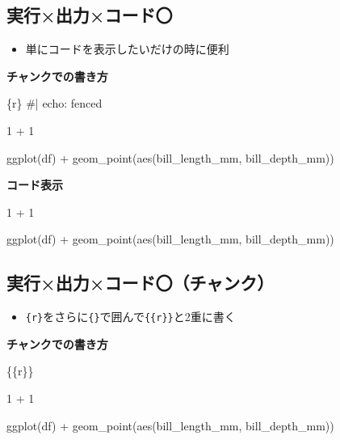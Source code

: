 \documentclass[
  b5paper,
  xelatex, ja=standard]{bxjsbook}
\newenvironment{Shaded}{\begin{snugshade}}{\end{snugshade}}
\newcommand{\DecValTok}[1]{\textcolor[rgb]{0.68,0.00,0.00}{#1}}
\newcommand{\FunctionTok}[1]{\textcolor[rgb]{0.28,0.35,0.67}{#1}}
\newcommand{\InformationTok}[1]{\textcolor[rgb]{0.37,0.37,0.37}{#1}}
\newcommand{\NormalTok}[1]{\textcolor[rgb]{0.00,0.23,0.31}{#1}}
\newcommand{\SpecialCharTok}[1]{\textcolor[rgb]{0.37,0.37,0.37}{#1}}
\providecommand{\tightlist}{%
  \setlength{\itemsep}{0pt}\setlength{\parskip}{0pt}}\usepackage{longtable,booktabs,array}
\begin{document}
\subsection{実行×\textbar 出力×\textbar コード〇}

\begin{itemize}
\tightlist
\item
  単にコードを表示したいだけの時に便利
\end{itemize}

\textbf{チャンクでの書き方}

\begin{Shaded}
\begin{Highlighting}[]
\InformationTok{\textasciigrave{}\textasciigrave{}\textasciigrave{}\{r\}}
\InformationTok{\#| echo: fenced}

\InformationTok{1 + 1}


\InformationTok{ggplot(df) +}
\InformationTok{  geom\_point(aes(bill\_length\_mm, bill\_depth\_mm))}
\InformationTok{\textasciigrave{}\textasciigrave{}\textasciigrave{}}
\end{Highlighting}
\end{Shaded}

\textbf{コード表示}

\begin{Shaded}
\begin{Highlighting}[]
\DecValTok{1} \SpecialCharTok{+} \DecValTok{1}


\FunctionTok{ggplot}\NormalTok{(df) }\SpecialCharTok{+}
  \FunctionTok{geom\_point}\NormalTok{(}\FunctionTok{aes}\NormalTok{(bill\_length\_mm, bill\_depth\_mm))}
\end{Highlighting}
\end{Shaded}

\subsection{実行×\textbar 出力×\textbar コード〇（チャンク）}

\begin{itemize}
\tightlist
\item
  \texttt{\{r\}}をさらに\texttt{\{\}}で囲んで\texttt{\{\{r\}\}}と2重に書く
\end{itemize}

\textbf{チャンクでの書き方}

\begin{Shaded}
\begin{Highlighting}[]
\InformationTok{\textasciigrave{}\textasciigrave{}\textasciigrave{}\{\{r\}\}}


\InformationTok{1 + 1}


\InformationTok{ggplot(df) +}
\InformationTok{  geom\_point(aes(bill\_length\_mm, bill\_depth\_mm))}
\InformationTok{\textasciigrave{}\textasciigrave{}\textasciigrave{}}
\end{Highlighting}
\end{Shaded}
\end{document}
